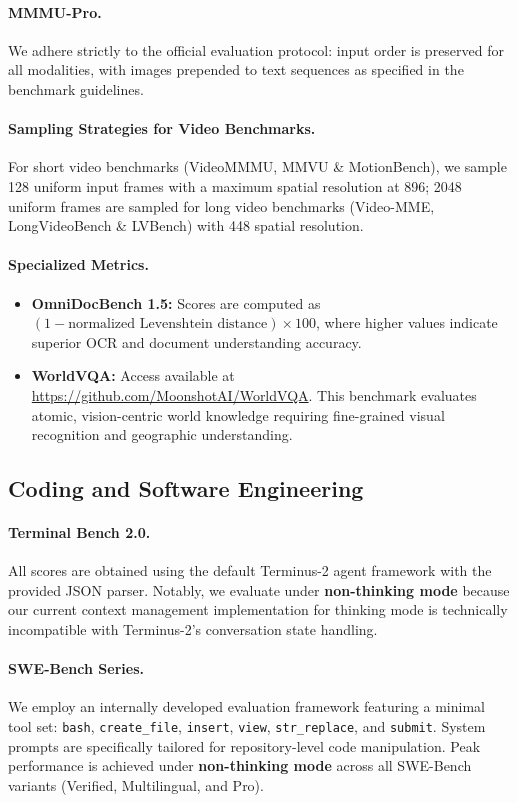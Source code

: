 \paragraph{MMMU-Pro.} We adhere strictly to the official evaluation protocol: input order is preserved for all modalities, with images prepended to text sequences as specified in the benchmark guidelines. 

\paragraph{Sampling Strategies for Video Benchmarks.} For short video benchmarks (VideoMMMU, MMVU \& MotionBench), we sample 128 uniform input frames with a maximum spatial resolution at 896; 2048 uniform frames are sampled for long video benchmarks (Video-MME, LongVideoBench \& LVBench) with 448 spatial resolution.

\paragraph{Specialized Metrics.} 
\begin{itemize}
    \item \textbf{OmniDocBench 1.5:} Scores are computed as $(1 - \text{normalized Levenshtein distance}) \times 100$, where higher values indicate superior OCR and document understanding accuracy.
    \item \textbf{WorldVQA:} Access available at \url{https://github.com/MoonshotAI/WorldVQA}. This benchmark evaluates atomic, vision-centric world knowledge requiring fine-grained visual recognition and geographic understanding.
\end{itemize}


\subsection{Coding and Software Engineering}
\label{app:eval_coding}

\paragraph{Terminal Bench 2.0.} All scores are obtained using the default Terminus-2 agent framework with the provided JSON parser. Notably, we evaluate under \textbf{non-thinking mode} because our current context management implementation for thinking mode is technically incompatible with Terminus-2's conversation state handling.

\paragraph{SWE-Bench Series.} We employ an internally developed evaluation framework featuring a minimal tool set: \texttt{bash}, \texttt{create\_file}, \texttt{insert}, \texttt{view}, \texttt{str\_replace}, and \texttt{submit}. System prompts are specifically tailored for repository-level code manipulation. Peak performance is achieved under \textbf{non-thinking mode} across all SWE-Bench variants (Verified, Multilingual, and Pro).

